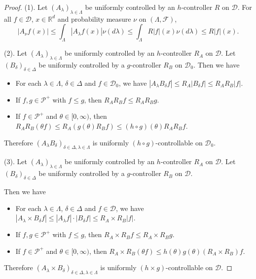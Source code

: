 \documentclass[12pt,a4paper]{amsart}
\theoremstyle{plain}
\theoremstyle{definition}
\numberwithin{equation}{section}
\begin{document}
\begin{proof}
    (1). Let $(A_\lambda)_{\lambda\in\Lambda}$ be uniformly controlled by an $h$-controller $R$ on $\mathcal D$. 
    For all $f \in \mathcal{D}$, $x\in \mathbb R^d$ and  probability measure $\nu$ on $(\Lambda, \mathscr F)$,
\[
    |A_{\nu}f(x)|\leq \int_{\Lambda}|A_{\lambda}f(x)|\nu(d\lambda) \leq \int_{\Lambda}R|f|(x)\nu(d\lambda) \leq R|f|(x).
\]

    (2). Let $(A_\lambda)_{\lambda\in\Lambda}$ be uniformly controlled by  an $h$-controller $R_A$ on $\mathcal D$.
    Let $(B_\delta)_{\delta\in\Delta}$ be uniformly controlled by a $g$-controller $R_B$ on $\mathcal D_0$.
    Then we have
\begin{itemize}
\item
    For each $\lambda \in \Lambda$, $\delta \in \Delta$ and $f\in \mathcal D_0$, we have $|A_\lambda B_\delta f| \leq R_A |B_\delta f| \leq R_A R_B |f|$.
\item
    If $f,g \in \mathcal P^+$ with $f\leq g$, then $R_AR_Bf \leq R_A R_B g$.
\item
    If $f \in \mathcal P^+$ and $\theta \in [0,\infty)$, then $R_AR_B(\theta f) \leq R_A(g(\theta) R_Bf) \leq (h\circ g)(\theta) R_A R_B f $.
\end{itemize}
    Therefore $(A_\lambda B_\delta)_{\delta\in \Delta, \lambda \in \Lambda}$ is uniformly $(h \circ g)$-controllable on $\mathcal D_0$.

    (3). Let $(A_\lambda)_{\lambda\in\Lambda}$ be uniformly controlled by an $h$-controller $R_A$ on $\mathcal D$.
    Let $(B_\delta)_{\delta\in\Delta}$ be uniformly controlled by a $g$-controller $R_B$ on $\mathcal D$.
    
    Then we have
\begin{itemize}
\item
    For each $\lambda \in \Lambda$, $\delta \in \Delta$ and $f\in \mathcal D$, we have $|A_\lambda \times B_\delta f| \leq |A_\lambda f| \cdot |B_\delta f| \leq R_A \times R_B |f|$.
\item
    If $f,g \in \mathcal P^+$ with $f\leq g$, then $R_A\times R_Bf \leq R_A\times R_B g$.
\item
    If $f \in \mathcal P^+$ and $\theta \in [0,\infty)$, then $R_A\times R_B (\theta f) \leq h(\theta) g(\theta) (R_A \times R_B) f $.
\end{itemize}
    Therefore $(A_\lambda \times B_\delta)_{\delta\in \Delta, \lambda \in \Lambda}$ is uniformly $(h \times g)$-controllable on $\mathcal D$.


\end{proof}
\end{document}
